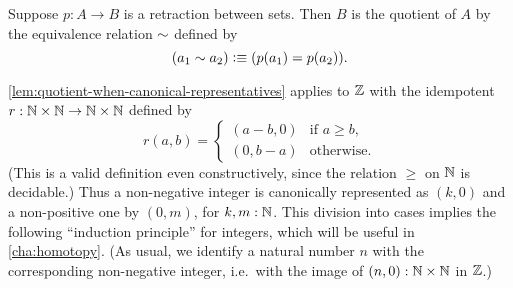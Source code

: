 \documentclass[hott-all.tex]{subfiles}
\begin{document}
% 
\begin{cor}
  Suppose $p:A\to B$ is a retraction between sets.
  Then $B$ is the quotient of $A$ by the equivalence relation $\sim$ defined by
  \[ (a_1 \sim a_2) \vcentcolon\equiv (p(a_1) = p(a_2)). \]
\end{cor}
% 
\begin{rmk}
\cref{lem:quotient-when-canonical-representatives} applies to $\mathbb{Z}$ with the idempotent $r : \mathbb{N} \times \mathbb{N} \to \mathbb{N} \times \mathbb{N}$
defined by
%
\begin{equation*}
  r(a, b) =
  \begin{cases}
    (a - b, 0) & \text{if $a \geq b$,} \\
    (0, b - a) & \text{otherwise.}
  \end{cases}
\end{equation*}
%
(This is a valid definition even constructively, since the relation $\geq$ on $\mathbb{N}$ is decidable.)
Thus a non-negative integer is canonically represented as $(k, 0)$ and a non-positive one by $(0, m)$, for $k,m:\mathbb{N}$.
This division into cases implies the following ``induction principle'' for integers, which will be useful in \cref{cha:homotopy}.
%
(As usual, we identify a natural number $n$ with the corresponding non-negative integer, i.e.\ with the image of $(n,0):\mathbb{N}\times\mathbb{N}$ in $\mathbb{Z}$.)
\end{rmk}
\end{document}
